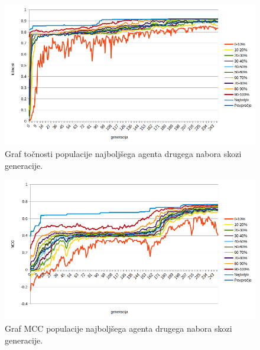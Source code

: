 \begin{figure}[H]
    \begin{center}
        \includegraphics[width=13cm]{shuttle/2/acc}
    \end{center}
    \caption{Graf točnosti populacije najboljšega agenta drugega nabora skozi generacije.}
    \label{fig:statlog_acc_2}
\end{figure}

\begin{figure}[H]
    \begin{center}
        \includegraphics[width=13cm]{shuttle/2/mcc}
    \end{center}
    \caption{Graf MCC populacije najboljšega agenta drugega nabora skozi generacije.}
    \label{fig:statlog_mcc_2}
\end{figure}


